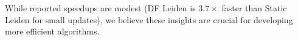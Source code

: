 \noindent
While reported speedups are modest (DF Leiden is $3.7\times$ faster than Static Leiden for small updates), we believe these insights are crucial for developing more efficient algorithms.










